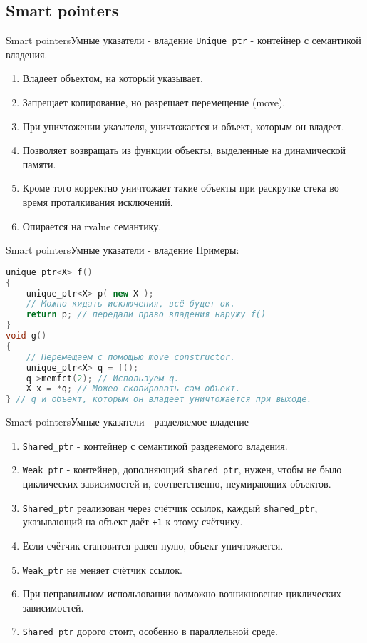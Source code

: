 \documentclass[10pt]{beamer}
\begin{document}
\subsection{Smart pointers}
\hypertarget{Smart pointers}{}
\begin{frame}[fragile]{Smart pointers}{Умные указатели - владение}
\texttt{Unique\_ptr} - контейнер с семантикой владения. 
\begin{enumerate}
    \item Владеет объектом, на который указывает.
    \item Запрещает копирование, но разрешает перемещение (move). 
    \item При уничтожении указателя, уничтожается и объект, которым он владеет. 
    \item Позволяет возвращать из функции объекты, выделенные на динамической памяти.
    \item Кроме того корректно уничтожает такие объекты при раскрутке стека во время проталкивания исключений.
    \item Опирается на rvalue семантику.
\end{enumerate}
\end{frame}
\begin{frame}[fragile]{Smart pointers}{Умные указатели - владение}
Примеры:
\begin{lstlisting}[language=C++]
unique_ptr<X> f()
{
    unique_ptr<X> p( new X );
    // Можно кидать исключения, всё будет ок.
    return p; // передали право владения наружу f()
}
void g()
{
    // Перемещаем с помощью move constructor.
    unique_ptr<X> q = f(); 
    q->memfct(2); // Используем q.
    X x = *q; // Можео скопировать сам объект.
} // q и объект, которым он владеет уничтожается при выходе.
\end{lstlisting}
\end{frame}
\begin{frame}[fragile]{Smart pointers}{Умные указатели - разделяемое владение}
\begin{enumerate}
\item \texttt{Shared\_ptr} - контейнер с семантикой раздеяемого владения. 
\item \texttt{Weak\_ptr} - контейнер, дополняющий \texttt{shared\_ptr}, нужен, чтобы не было циклических зависимостей и, соответственно, неумирающих объектов.\\ 
\item \texttt{Shared\_ptr} реализован через счётчик ссылок, каждый \texttt{shared\_ptr}, указывающий на объект даёт \texttt{+1} к этому счётчику. 
\item Если счётчик становится равен нулю, объект уничтожается. 
\item \texttt{Weak\_ptr} не меняет счётчик ссылок.
\item При неправильном использовании возможно возникновение циклических зависимостей.
\item \texttt{Shared\_ptr} дорого стоит, особенно в параллельной среде.
\end{enumerate}
\end{frame}
\end{document}
